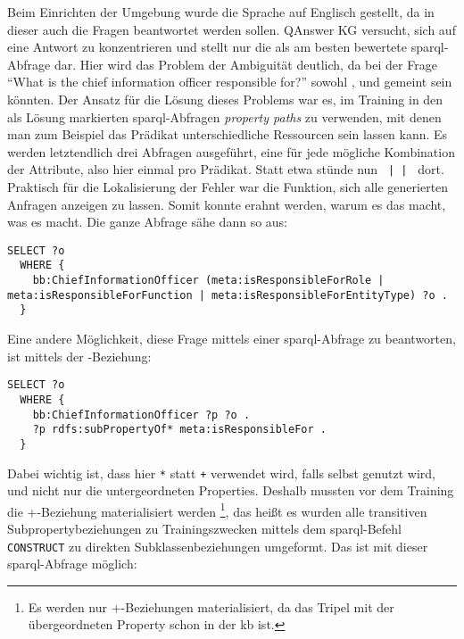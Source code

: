 Beim Einrichten der Umgebung wurde die Sprache auf Englisch gestellt, da in dieser auch die Fragen beantwortet werden sollen.
QAnswer KG versucht, sich auf eine Antwort zu konzentrieren und stellt nur die als am besten bewertete \ac{sparql}-Abfrage dar.
Hier wird das Problem der Ambiguität deutlich, da bei der Frage \enquote{What is the chief information officer responsible for?} sowohl
,  und  gemeint sein könnten.
Der Ansatz für die Lösung dieses Problems war es, im Training in den als Lösung markierten \ac{sparql}-Abfragen \emph{property paths} zu verwenden,
mit denen man zum Beispiel das Prädikat unterschiedliche Ressourcen sein lassen kann.
Es werden letztendlich drei Abfragen ausgeführt, eine für jede mögliche Kombination der Attribute, also hier einmal pro Prädikat.
Statt etwa \texttt{} stünde nun \texttt{ |  | } dort.
Praktisch für die Lokalisierung der Fehler war die Funktion, sich alle generierten Anfragen anzeigen zu lassen.
Somit konnte erahnt werden, warum es das macht, was es macht.
Die ganze Abfrage sähe dann so aus:
\begin{lstlisting}[language=SPARQL]
  SELECT ?o
  WHERE {
    bb:ChiefInformationOfficer (meta:isResponsibleForRole | meta:isResponsibleForFunction | meta:isResponsibleForEntityType) ?o .
  }
\end{lstlisting}

Eine andere Möglichkeit, diese Frage mittels einer \ac{sparql}-Abfrage zu beantworten, ist mittels der -Beziehung:
\begin{lstlisting}[language=SPARQL]
  SELECT ?o
  WHERE {
    bb:ChiefInformationOfficer ?p ?o .
    ?p rdfs:subPropertyOf* meta:isResponsibleFor .
  }
\end{lstlisting}
Dabei wichtig ist, dass hier \texttt{*} statt \texttt{+} verwendet wird, falls  selbst genutzt wird,
und nicht nur die untergeordneten Properties.
Deshalb mussten vor dem Training die +-Beziehung materialisiert werden%
\footnote{Es werden nur +-Beziehungen materialisiert, da das Tripel mit der übergeordneten Property schon in der \ac{kb} ist.},
das heißt es wurden alle transitiven Subpropertybeziehungen zu Trainingszwecken mittels dem \ac{sparql}-Befehl \texttt{CONSTRUCT} zu direkten Subklassenbeziehungen umgeformt.
Das ist mit dieser \ac{sparql}-Abfrage möglich:

